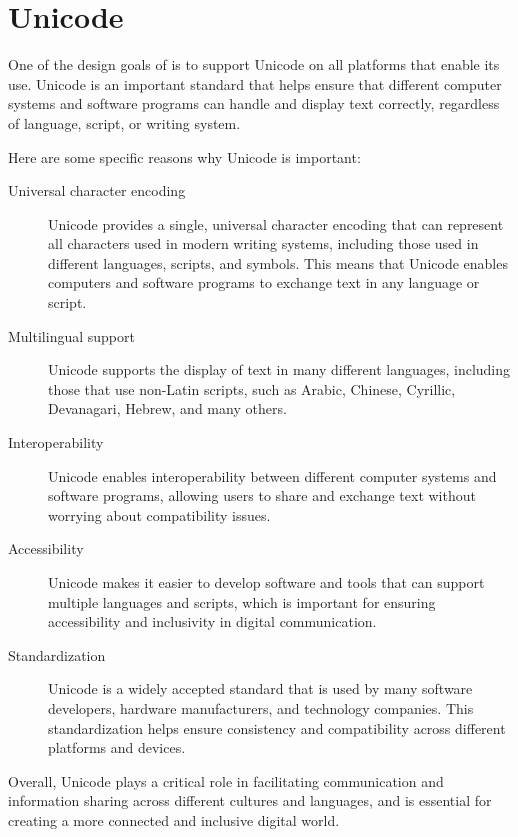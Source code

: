 \chapter{Unicode}
One of the design goals of \crexx{} is to support Unicode on all
platforms that enable its use. 
Unicode is an important standard that helps ensure that different computer systems and software programs can handle and display text correctly, regardless of language, script, or writing system.

Here are some specific reasons why Unicode is important:
\begin{description}
\item[Universal character encoding] Unicode provides a single, universal character encoding that can represent all characters used in modern writing systems, including those used in different languages, scripts, and symbols. This means that Unicode enables computers and software programs to exchange text in any language or script.
\item[Multilingual support] Unicode supports the display of text in many different languages, including those that use non-Latin scripts, such as Arabic, Chinese, Cyrillic, Devanagari, Hebrew, and many others.
\item[Interoperability] Unicode enables interoperability between different computer systems and software programs, allowing users to share and exchange text without worrying about compatibility issues.
\item[Accessibility] Unicode makes it easier to develop software and tools that can support multiple languages and scripts, which is important for ensuring accessibility and inclusivity in digital communication.
\item[Standardization] Unicode is a widely accepted standard that is
  used by many software developers, hardware manufacturers, and
  technology companies. This standardization helps ensure consistency
  and compatibility across different platforms and devices.
\end{description}
Overall, Unicode plays a critical role in facilitating communication
and information sharing across different cultures and languages, and
is essential for creating a more connected and inclusive digital
world.
